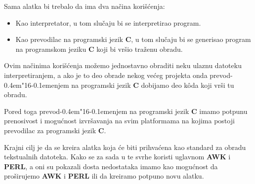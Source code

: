 \documentclass[12pt,a4paper]{article}
\def\d{d\kern-0.4em\char"16\kern-0.1em}
\begin{document}
    Sama alatka bi trebalo da ima dva na\v cina kori\v s\'cenja:
    \begin{itemize}
    \item
      Kao interpretator, u tom slu\v caju bi se interpretirao program.
    \item
      Kao prevodilac na programski jezik {\bf C}, u tom slu\v caju bi se
      generisao program na programskom jeziku {\bf C} koji bi vr\v sio
      tra\v zenu obradu.
    \end{itemize}

    Ovim na\v cinima kori\v s\'cenja mo\v zemo jednostavno obraditi neku
    ulaznu da\-toteku interpretiranjem, a ako je to deo obrade nekog ve\'ceg
    projekta onda prevo\d enjem na programski jezik {\bf C} dobijamo deo
    k\^oda koji vr\v si tu obradu.

    Pored toga prevo\d enjem na programski jezik {\bf C} imamo potpunu
    prenosivost i mogu\'cnost izvr\v savanja na svim platformama na kojima
    postoji prevodilac za programski jezik {\bf C}.

    Krajni cilj je da se kreira alatka koja \'ce biti prihva\'cena kao
    standard za obradu tekstualnih datoteka.
    Kako se za sada u te svrhe koristi uglavnom {\bf AWK} i {\bf PERL}, a
    oni su pokazali dosta nedostataka imamo kao mogu\'cnost da pro\v sirujemo
    {\bf AWK} i {\bf PERL} ili da kreiramo potpuno novu alatku.
\end{document}
